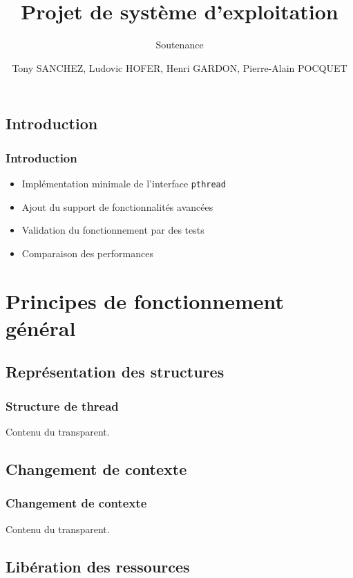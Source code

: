 \documentclass{beamer}
\title{Projet de système d'exploitation}
\subtitle{Soutenance}
\author{Tony SANCHEZ, Ludovic HOFER, Henri GARDON, Pierre-Alain POCQUET}
\institute{ENSEIRB-MATMECA}
\begin{document}
 
\maketitle

\tableofcontents
 
\begin{frame}
\section{Introduction}
\frametitle{Introduction}

\begin{itemize}
\item Implémentation minimale de l'interface \verb!pthread!
\item Ajout du support de fonctionnalités avancées
\item Validation du fonctionnement par des tests
\item Comparaison des performances
\end{itemize}
 
\end{frame}

\section{Principes de fonctionnement général}
\subsection{Représentation des structures}

\begin{frame}
\frametitle{Structure de thread}
 
Contenu du transparent.
 
\end{frame}

\subsection{Changement de contexte}

\begin{frame}
  \frametitle{Changement de contexte}
  Contenu du transparent.

\end{frame}

\subsection{Libération des ressources}
\end{document}
